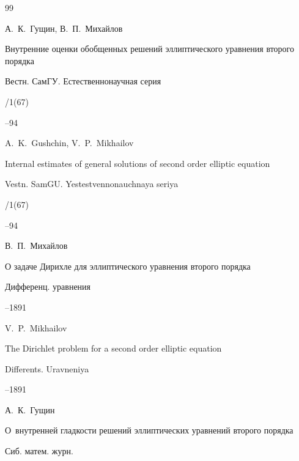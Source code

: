 \begin{thebibliography}{99}

\by А.~К.~Гущин, В.~П.~Михайлов

\paper Внутренние оценки обобщенных решений эллиптического уравнения второго порядка

\jour  Вестн. СамГУ. Естественнонаучная серия


/1(67)

–94

\misctransl

\by A.~K.~Gushchin, V.~P.~Mikhailov

\paper Internal estimates of general solutions of second order elliptic equation

\jour  Vestn. SamGU. Yestestvennonauchnaya seriya


/1(67)

–94






\by В.~П.~Михайлов

\paper О задаче Дирихле для эллиптического уравнения второго порядка 

\jour Дифференц. уравнения




–1891

\misctransl 

\by V.~P.~Mikhailov

\paper  The Dirichlet problem for a second order elliptic equation

\jour Differents. Uravneniya 




–1891






\by А.~К.~Гущин

\paper О~внутренней гладкости решений эллиптических уравнений второго порядка

\jour Сиб. матем. журн.





\end{thebibliography}
